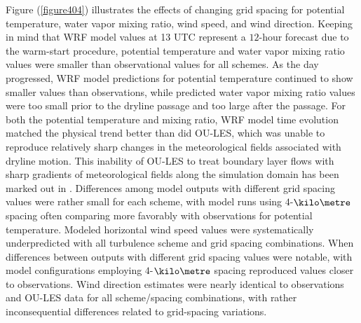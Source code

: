 Figure (\autoref{figure404}) illustrates the effects of changing grid spacing for potential temperature, water vapor mixing ratio, wind speed, and wind direction. Keeping in mind that WRF model values at 13 UTC represent a $12$-hour forecast due to the warm-start procedure, potential temperature and water vapor mixing ratio values were smaller than observational values for all schemes. As the day progressed, WRF model predictions for potential temperature continued to show smaller values than observations, while predicted water vapor mixing ratio values were too small prior to the dryline passage and too large after the passage. For both the potential temperature and mixing ratio, WRF model time evolution matched the physical trend better than did OU-LES, which was unable to reproduce relatively sharp changes in the meteorological fields associated with dryline motion. This inability of OU-LES to treat boundary layer flows with sharp gradients of meteorological fields along the simulation domain has been marked out in  \citet{Confe2008}. Differences among model outputs with different grid spacing values were rather small for each scheme, with model runs using $4$-$\kilo\metre$ spacing often comparing more favorably with observations for potential temperature. Modeled horizontal wind speed values were systematically underpredicted with all turbulence scheme and grid spacing combinations. When differences between outputs with different grid spacing values were notable, with model configurations employing $4$-$\kilo\metre$ spacing reproduced values closer to observations. Wind direction estimates were nearly identical to observations and OU-LES data for all scheme\slash spacing combinations, with rather inconsequential differences related to grid-spacing variations.


